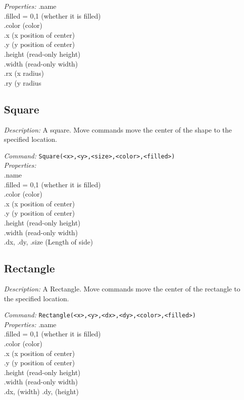 \emph{Properties:}
.name\\
.filled = {0,1} (whether it is filled)\\
.color (color) \\
.x  (x position of center) \\
.y  (y position of center)\\
.height (read-only height)\\
.width (read-only width)\\
.rx  (x radius)\\
.ry  (y radius


\subsection{Square}

\emph{Description:} A square. Move commands move the center
  of the shape to the specified location.

\emph{Command:}  \verb+Square(<x>,<y>,<size>,<color>,<filled>)+\\

\emph{Properties:}\\
.name\\
.filled = 0,1 (whether it is filled)\\
.color (color) \\
.x  (x position of center) \\
.y  (y position of center)\\
.height (read-only height)\\
.width (read-only width)\\
.dx, .dy, .size  (Length of side)\\


\subsection{Rectangle}
\emph{Description:} A Rectangle. Move commands move the center
  of the rectangle to the specified location.

\emph{Command:}  \verb+Rectangle(<x>,<y>,<dx>,<dy>,<color>,<filled>)+\\

\emph{Properties:}
.name\\
.filled = {0,1} (whether it is filled)\\
.color (color) \\
.x  (x position of center) \\
.y  (y position of center)\\
.height (read-only height)\\
.width (read-only width)\\
.dx, (width)
.dy,  (height)\\



